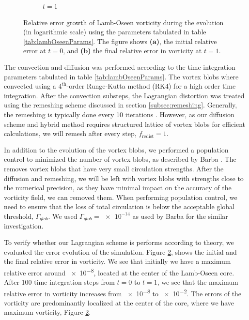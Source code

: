 \begin{figure}[!t]
\begin{subfigure}[b]{0.45\textwidth}
	          \caption{$t=1$}
	          \label{fig:lambOseen_convection_vorticityErrorContours_final}
	  \end{subfigure}
	  
	  \caption{Relative error growth of Lamb-Oseen vorticity during the evolution (in logarithmic scale) using the parameters tabulated in table \ref{tab:lambOseenParams}. The figure shows \textbf{(a)}, the initial relative error at $t=0$, and \textbf{(b)} the final relative error in vorticity at $t=1$.}
	  \label{fig:lambOseen_convection_vorticityErrorContours}
		\end{figure}


The convection and diffusion was performed according to the time integration parameters tabulated in table \ref{tab:lambOseenParams}. The vortex blobs where convected using a $4^{\mathrm{th}}$-order Runge-Kutta method ($\mathrm{RK4}$) for a high order time integration. After the convection substeps, the Lagrangian distortion was treated using the remeshing scheme discussed in section \ref{subsec:remeshing}. Generally, the remeshing is typically done every 10 iterations \cite{Barba2004c}. However, as our diffusion scheme and hybrid method requires structured lattice of vortex blobs for efficient calculations, we will remesh after every step, $f_{\mathrm{redist}}=1$.  


In addition to the evolution of the vortex blobs, we performed a population control to minimized the number of vortex blobs, as described by Barba \cite{Barba2004c}. The  removes vortex blobs that have very small circulation strengths. After the diffusion and remeshing, we will be left with vortex blobs with strengths close to the numerical precision, as they have minimal impact on the accuracy of the vorticity field, we can removed them. When performing population control, we need to ensure that the loss of total circulation is below the acceptable global threshold, $\Gamma_{glob}$. We used $\Gamma_{glob}=\num{e-14}$ as used by Barba \cite{Barba2004c} for the similar investigation. 

To verify whether our Lagrangian scheme is performs according to theory, we evaluated the error evolution of the simulation. Figure \ref{fig:lambOseen_convection_vorticityErrorContours}, shows the initial and the final relative error in vorticity. We see that initially we have a maximum relative error around \num{e-8}, located at the center of the Lamb-Oseen core. After 100 time integration steps from $t=0$ to $t=1$, we see that the maximum relative error in vorticity increases from \num{e-8} to \num{e-2}. The errors of the vorticity are predominantly localized at the center of the core, where we have maximum vorticity, Figure \ref{fig:lambOseen_convection_vorticityErrorContours}.




